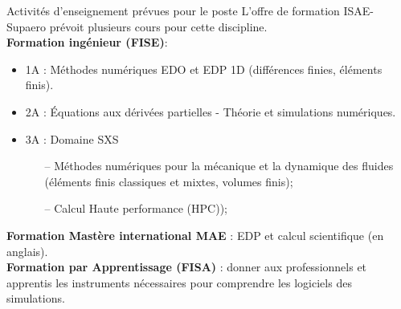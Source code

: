 \documentclass[aspectratio=169, french]{beamer}
\begin{document}
\begin{frame}{Activités d'enseignement prévues pour le poste}
	L'offre de formation ISAE-Supaero prévoit plusieurs cours pour cette discipline.\\
	\vspace{.5cm}
\textbf{Formation ingénieur (FISE)}:
\begin{itemize}
\item 1A : Méthodes numériques EDO et EDP 1D (différences finies, éléments finis).
\item 2A : Équations aux dérivées partielles - Théorie et simulations numériques.
\item 3A : Domaine SXS 
\begin{itemize}
	\item[--] Méthodes numériques pour la mécanique et la dynamique des fluides (éléments finis classiques et mixtes, volumes finis);
	\item[--] Calcul Haute performance (HPC));
\end{itemize}
\end{itemize}
\vspace{.5cm}
\textbf{Formation Mastère international MAE} :  EDP et calcul scientifique (en anglais).\\
\vspace{.5cm}
\textbf{Formation par Apprentissage (FISA)} : donner aux professionnels et apprentis les instruments nécessaires pour comprendre les logiciels des simulations.
	
\end{frame}
\end{document}
